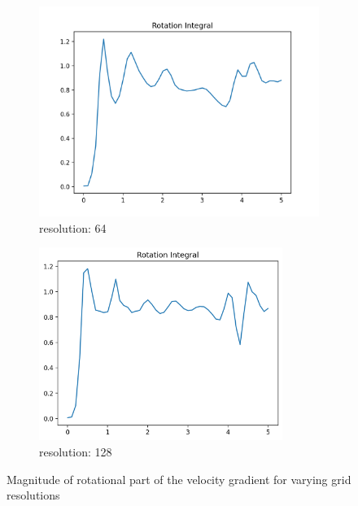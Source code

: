 \documentclass[a4paper,12pt]{article}
\begin{document}
\begin{figure}
     \begin{subfigure}[b]{0.45\textwidth}
         \centering
         \includegraphics[width=\textwidth]{imgs/results-KHI-RE10000.0-RSL64-rr_integral}
         \caption{resolution: 64}
         \label{fig:re10000-rs64}
     \end{subfigure}
     \hfill
     \begin{subfigure}[b]{0.45\textwidth}
         \centering
         \includegraphics[width=0.87\textwidth]{imgs/results-KHI-RE10000.0-RSL128-rr_integral}
         \caption{resolution: 128}
         \label{fig:re10000-rs128}
     \end{subfigure}
        \caption{Magnitude of rotational part of the velocity gradient for varying grid resolutions}
        \label{fig:rr-resolution}
\end{figure}
\end{document}
